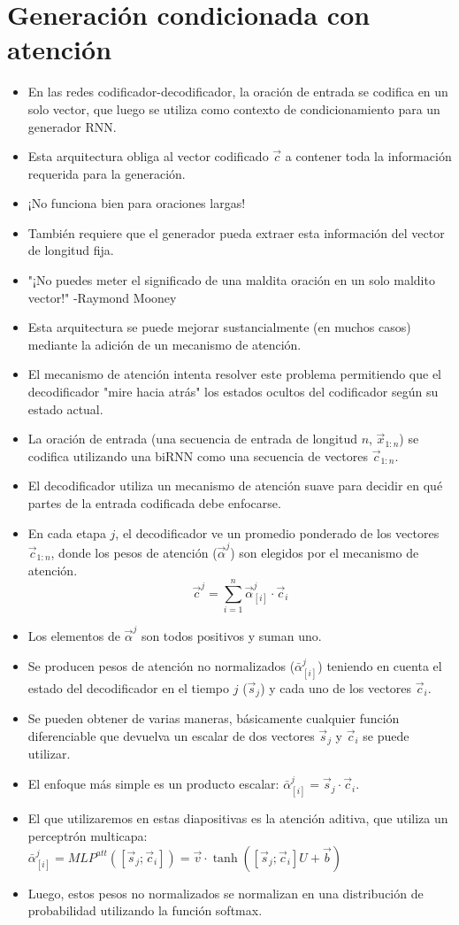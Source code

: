 \documentclass{book}
\begin{document}
\section{Generación condicionada con atención}
\begin{itemize}
\item En las redes codificador-decodificador, la oración de entrada se codifica en un solo vector, que luego se utiliza como contexto de condicionamiento para un generador RNN.
\item Esta arquitectura obliga al vector codificado $\vec{c}$ a contener toda la información requerida para la generación.
\item ¡No funciona bien para oraciones largas!
\item También requiere que el generador pueda extraer esta información del vector de longitud fija.
\item "¡No puedes meter el significado de una maldita oración en un solo maldito vector!" -Raymond Mooney
\item Esta arquitectura se puede mejorar sustancialmente (en muchos casos) mediante la adición de un mecanismo de atención.
\item El mecanismo de atención intenta resolver este problema permitiendo que el decodificador "mire hacia atrás" los estados ocultos del codificador según su estado actual.
\item La oración de entrada (una secuencia de entrada de longitud $n$, $\vec{x}_{1:n}$) se codifica utilizando una biRNN como una secuencia de vectores $\vec{c}_{1:n}$.
\item El decodificador utiliza un mecanismo de atención suave para decidir en qué partes de la entrada codificada debe enfocarse.
\item En cada etapa $j$, el decodificador ve un promedio ponderado de los vectores $\vec{c}_{1:n}$, donde los pesos de atención ($\vec{\alpha}^j$) son elegidos por el mecanismo de atención.
\begin{displaymath}
\vec{c}^j = \sum_{i=1}^{n} \vec{\alpha}_{[i]}^{j}\cdot \vec{c}_i
\end{displaymath}
\item Los elementos de $\vec{\alpha}^j$ son todos positivos y suman uno.
\item Se producen pesos de atención no normalizados ($\bar{\alpha}_{[i]}^j$) teniendo en cuenta el estado del decodificador en el tiempo $j$ ($\vec{s}_j$) y cada uno de los vectores $\vec{c}_i$.
\item Se pueden obtener de varias maneras, básicamente cualquier función diferenciable que devuelva un escalar de dos vectores $\vec{s}_j$ y $\vec{c}_i$ se puede utilizar.
\item El enfoque más simple es un producto escalar: $\bar{\alpha}_{[i]}^j = \vec{s}_j \cdot \vec{c}_i$.
\item El que utilizaremos en estas diapositivas es la atención aditiva, que utiliza un perceptrón multicapa: $\bar{\alpha}_{[i]}^j = MLP^{att}([\vec{s}_j;\vec{c}_i]) = \vec{v} \cdot \operatorname{tanh}([\vec{s}_j;\vec{c}_i]U +\vec{b})$
\item Luego, estos pesos no normalizados se normalizan en una distribución de probabilidad utilizando la función softmax.


\end{itemize}
\end{document}

